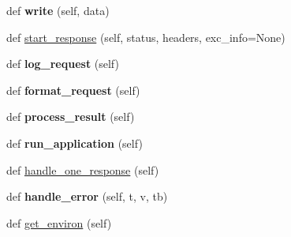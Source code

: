 \begin{DoxyCompactItemize}
\item 
\mbox{\label{classgevent_1_1pywsgi_1_1_w_s_g_i_handler_a1e84a8beb80c489aadbd512e026f7d74}} 
def {\bfseries write} (self, data)
\item 
def \hyperlink{classgevent_1_1pywsgi_1_1_w_s_g_i_handler_a92d7db46cfee34e1012de6e20ee3c0ea}{start\+\_\+response} (self, status, headers, exc\+\_\+info=None)
\item 
\mbox{\label{classgevent_1_1pywsgi_1_1_w_s_g_i_handler_ae280219e1f961bc9044771b122eeadf5}} 
def {\bfseries log\+\_\+request} (self)
\item 
\mbox{\label{classgevent_1_1pywsgi_1_1_w_s_g_i_handler_a833b31d54ddbca8ead206e69f22a453c}} 
def {\bfseries format\+\_\+request} (self)
\item 
\mbox{\label{classgevent_1_1pywsgi_1_1_w_s_g_i_handler_aaa6fdda16a4028cf937fe287786758dd}} 
def {\bfseries process\+\_\+result} (self)
\item 
\mbox{\label{classgevent_1_1pywsgi_1_1_w_s_g_i_handler_aeb265718993d9733ae6fc887421e0377}} 
def {\bfseries run\+\_\+application} (self)
\item 
def \hyperlink{classgevent_1_1pywsgi_1_1_w_s_g_i_handler_a6d7a625a107d805c77c9ac6b30fae3b2}{handle\+\_\+one\+\_\+response} (self)
\item 
\mbox{\label{classgevent_1_1pywsgi_1_1_w_s_g_i_handler_a1342bb624c62725898045ab90de28fd1}} 
def {\bfseries handle\+\_\+error} (self, t, v, tb)
\item 
def \hyperlink{classgevent_1_1pywsgi_1_1_w_s_g_i_handler_a8337b61957f372c7a6cc62e57298d182}{get\+\_\+environ} (self)
\end{DoxyCompactItemize}
